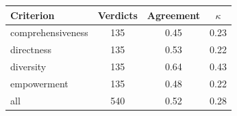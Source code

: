 \begin{tabular}{lccc}
\toprule
Criterion & Verdicts & Agreement & $\kappa$ \\
\midrule
comprehensiveness & 135 & 0.45 & 0.23 \\
directness & 135 & 0.53 & 0.22 \\
diversity & 135 & 0.64 & 0.43 \\
empowerment & 135 & 0.48 & 0.22 \\
all & 540 & 0.52 & 0.28 \\
\bottomrule
\end{tabular}
